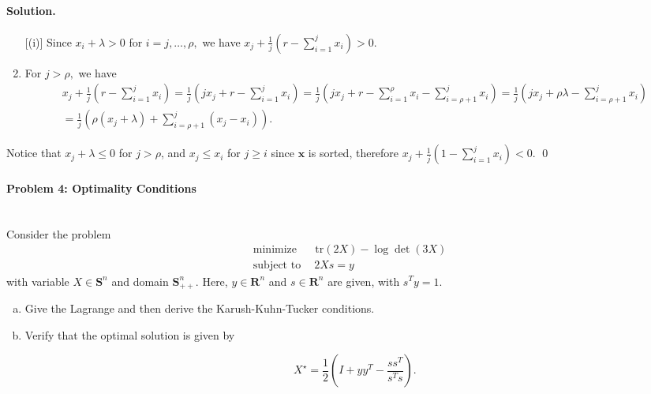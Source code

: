 \documentclass[a4paper]{article}
\newenvironment{solution}
{\color{blue} \paragraph{Solution.\\}}
{\newline \qed}
\begin{document}
\begin{solution}
\begin{enumerate} [(i)]
Since $x_i+\lambda>0$ for $i=j,\dots,\rho,$ we have $x_j+\frac{1}{j}(r-\sum_{i=1}^jx_i)>0.$
\item For $j>\rho ,$ we have
\begin{equation}\nonumber
\begin{aligned}
x_j+\frac{1}{j}\left(r-\sum_{i=1}^j x_i\right)=\frac{1}{j}(jx_j+r-\sum_{i=1}^j x_i)=\frac{1}{j}\left(jx_j+r-\sum_{i=1}^\rho x_i-\sum_{i=\rho +1}^j x_i\right)=\frac{1}{j}\left(jx_j+\rho\lambda-\sum_{i=\rho+1}^j x_i\right) \\ =\frac{1}{j}\left(\rho(x_j+\lambda)+\sum_{i=\rho+1}^j(x_j-x_i)\right).
\end{aligned}
\end{equation}
\end{enumerate}
\qquad Notice that $x_j+\lambda\leq 0$ for $j>\rho$, and $x_j\leq x_i$ for $j\geq i$ since $\textbf{x}$ is sorted, therefore $x_j+\frac{1}{j}(1-\sum_{i=1}^jx_i)<0.$
\end{solution}

\paragraph{Problem 4: Optimality Conditions}
~\\
Consider the problem
\begin{equation*}
    \begin{split}
        &\text{minimize~~} \quad  \text{tr}(2X) - \log{\det{(3X)}} \\
        &\text{subject to} \quad~  2Xs=y
    \end{split}
\end{equation*}
with variable $X \in \mathbf{S}^n$ and domain $\mathbf{S}_{++}^n$. Here, $y \in \mathbf{R}^n$ and $s \in \mathbf{R}^n$ are given, with $s^T y =1$.
\begin{enumerate}[a)]
    \item Give the Lagrange and then derive the Karush-Kuhn-Tucker conditions.
    \item Verify that the optimal solution is given by
\

    \begin{equation*}
        X^\star = \frac{1}{2} \left(I + yy^T - \frac{ss^T}{s^T s}\right) .
    \end{equation*}
\end{enumerate}
\end{document}
